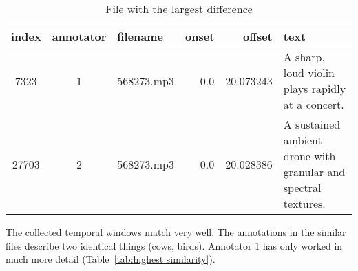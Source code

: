 \begin{table}[h]
  \caption{File with the largest difference}
  \label{tab:largest difference}
  \centering
  \begin{tabular}{cclrrp{7.5cm}}
    \toprule
    index & annotator & filename & onset & offset & text \\
    \midrule
    7323 & 1 & 568273.mp3 & 0.0 & 20.073243 & A sharp, loud violin plays rapidly at a concert. \\
    27703 & 2 & 568273.mp3 & 0.0 & 20.028386 & A sustained ambient drone with granular and spectral textures. \\
    \bottomrule
  \end{tabular}
\end{table}

The collected temporal windows match very well. The annotations in the similar files describe two identical things (cows, birds).
Annotator 1 has only worked in much more detail (Table~\ref{tab:highest similarity}).

